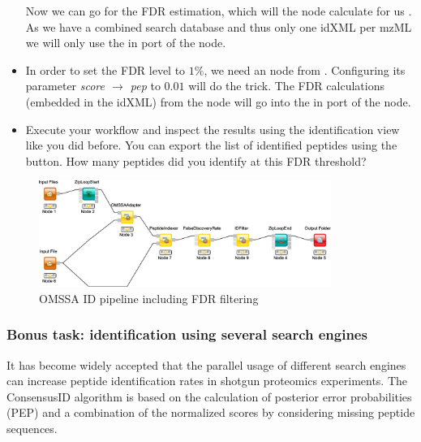 \begin{itemize}
Now we can go for the FDR estimation, which will the  node calculate for us .
As we have a combined search database and thus only one idXML per mzML we will only use the in port of the  node.
\item
In order to set the FDR level to $1\%$, we need an  node from .
Configuring its parameter \textit{score $\rightarrow$ pep} to $0.01$ will do the trick.
The FDR calculations (embedded in the idXML) from the  node will go into the in port of the  node.
\item
Execute your workflow and inspect the results using the identification view like you did before.
You can export the list of identified peptides using the  button. How many peptides did you identify at this FDR threshold?
\end{itemize}

\begin{figure}[htbp]
  \centering
  \includegraphics[width=0.85\textwidth]{graphics/labelfree/fdr_peptide_identification}
  \caption{OMSSA ID pipeline including FDR filtering}
  \label{fig:id_fdr}
\end{figure}

\subsubsection{Bonus task: identification using several search engines}
It has become widely accepted that the parallel usage of different search engines can increase peptide identification rates in shotgun proteomics experiments. The ConsensusID algorithm is based on the calculation of posterior error probabilities (PEP) and a combination of the normalized scores by considering missing peptide sequences.

